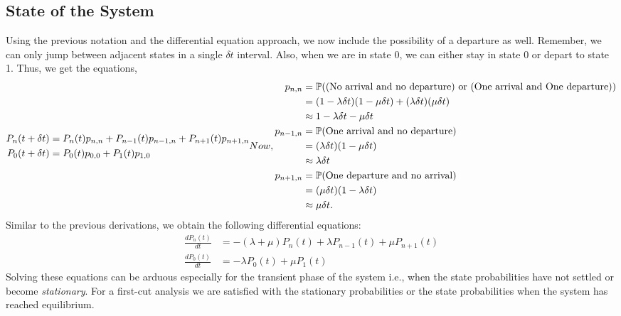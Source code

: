 \documentclass[11pt, a4paper]{report}
\begin{document}
\subsection{State of the System}
Using the previous notation and the differential equation approach, we now include the possibility of a departure as well. Remember, we can only jump between adjacent states in a single $\delta t$ interval. Also, when we are in state 0, we can either stay in state 0 or depart to state 1.
Thus, we get the equations,
\begin{subequations}
    \begin{align}
        P_n(t + \delta t) &= P_n(t) p_{n, n} + P_{n-1}(t)p_{n-1, n} + P_{n+1}(t) p_{n+1, n} \\
        P_0(t + \delta t) &= P_0(t)p_{0, 0} + P_1(t)p_{1, 0}
    \end{align}
    Now, 
    \begin{align}
        p_{n, n} &= \sP(\text{(No arrival and no departure) or (One arrival and One departure)}) \\ 
        &= (1 - \lambda \delta t)(1 - \mu \delta t) + (\lambda \delta t)(\mu \delta t) \\
        &\approx 1 - \lambda \delta t - \mu \delta t \\
        p_{n-1, n} &= \sP(\text{One arrival and no departure}) \\
        &= (\lambda \delta t)(1 - \mu \delta t) \\
        &\approx \lambda \delta t \\
        p_{n+1, n} &= \sP(\text{One departure and no arrival})\\
        &= (\mu \delta t)(1 - \lambda \delta t) \\
        & \approx \mu \delta t.  
    \end{align}  
    \label{eq:stateMM1}
\end{subequations}
Similar to the previous derivations, we obtain
 the following differential equations:
\begin{subequations}
    \begin{align}
        \frac{d P_n(t)}{d t} &= -(\lambda + \mu) P_n(t) + \lambda P_{n-1}(t) + \mu P_{n+1}(t) \\
        \frac{d P_0(t)}{d t} &= -\lambda P_0(t) + \mu P_{1}(t) 
    \end{align}
\end{subequations}
Solving these equations can be arduous especially for the transient phase of the system i.e., when the state probabilities have not settled or become \emph{stationary}. For a first-cut analysis we are satisfied with the stationary probabilities or the state probabilities when the system has reached equilibrium.
\end{document}
